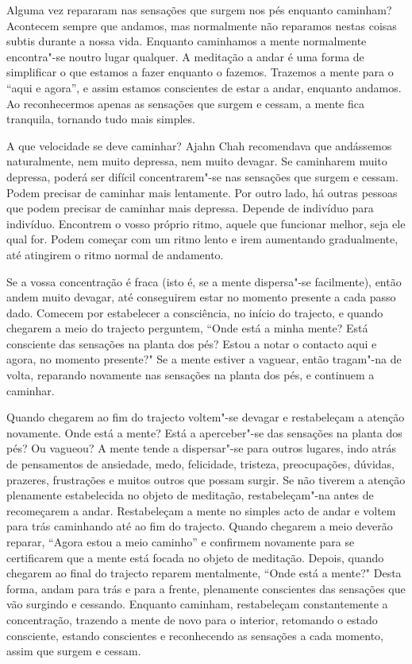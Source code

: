 Alguma vez repararam nas sensações que surgem nos pés enquanto caminham?
Acontecem sempre que andamos, mas normalmente não reparamos nestas
coisas subtis durante a nossa vida. Enquanto caminhamos a mente
normalmente encontra"-se noutro lugar qualquer. A meditação a andar é uma
forma de simplificar o que estamos a fazer enquanto o fazemos. Trazemos
a mente para o ``aqui e agora'', e assim estamos conscientes de estar a
andar, enquanto andamos. Ao reconhecermos apenas as sensações que surgem
e cessam, a mente fica tranquila, tornando tudo mais simples.

A que velocidade se deve caminhar? Ajahn Chah recomendava que
andássemos naturalmente, nem muito depressa, nem muito devagar. Se
caminharem muito depressa, poderá ser difícil concentrarem"-se nas
sensações que surgem e cessam. Podem precisar de caminhar mais
lentamente. Por outro lado, há outras pessoas que podem precisar de
caminhar mais depressa. Depende de indivíduo para indivíduo. Encontrem o
vosso próprio ritmo, aquele que funcionar melhor, seja ele qual for.
Podem começar com um ritmo lento e irem aumentando gradualmente, até
atingirem o ritmo normal de andamento.

Se a vossa concentração é fraca (isto é, se a mente dispersa"-se facilmente),
então andem muito devagar, até conseguirem estar no momento presente a
cada passo dado. Comecem por estabelecer a consciência, no início do
trajecto, e quando chegarem a meio do trajecto perguntem, ``Onde está a minha
mente? Está consciente das sensações na planta dos pés? Estou a notar o
contacto aqui e agora, no momento presente?" Se a mente estiver a
vaguear, então tragam"-na de volta, reparando novamente nas sensações na
planta dos pés, e continuem a caminhar.

Quando chegarem ao fim do trajecto voltem"-se devagar e restabeleçam a atenção novamente. Onde está a mente? Está a aperceber"-se das sensações
na planta dos pés? Ou vagueou? A mente tende a dispersar"-se para outros
lugares, indo atrás de pensamentos de ansiedade, medo, felicidade,
tristeza, preocupações, dúvidas, prazeres, frustrações e muitos outros
que possam surgir. Se não tiverem a atenção plenamente estabelecida no
objeto de meditação, restabeleçam"-na antes de recomeçarem a andar.
Restabeleçam a mente no simples acto de andar e voltem para trás
caminhando até ao fim do trajecto. Quando chegarem a meio deverão
reparar, ``Agora estou a meio caminho'' e confirmem novamente para se
certificarem que a mente está focada no objeto de meditação. Depois,
quando chegarem ao final do trajecto reparem mentalmente, ``Onde está a
mente?" Desta forma, andam para trás e para a frente, plenamente
conscientes das sensações que vão surgindo e cessando. Enquanto
caminham, restabeleçam constantemente a concentração, trazendo a mente de
novo para o interior, retomando o estado consciente, estando conscientes e
reconhecendo as sensações a cada momento, assim que surgem e cessam.

